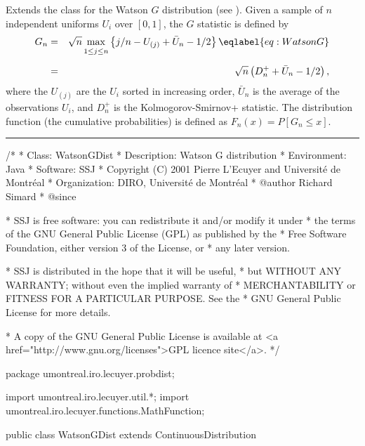 
Extends the class  for the
Watson $G$  distribution (see \cite{tDAR83a,tWAT76a}).
Given a sample of $n$ independent uniforms $U_i$ over $[0,1]$,
the $G$ statistic is defined by
 \begin {eqnarray}
  G_n &=& \sqrt{n} \max_{\rule{0pt}{7pt} 1\le j \le n} \left\{ j/n -
         U_{(j)} + \bar U_n - 1/2 \right\}  \eqlabel {eq:WatsonG} \\[6pt]
    &=& \sqrt{n}\left (D_n^+ + \bar U_n  - 1/2\right), \nonumber
 \end {eqnarray}
  where the $U_{(j)}$ are the $U_i$ sorted in increasing order,
  $\bar U_n$ is the average of the observations $U_{i}$,
  and $D_n^+$ is the Kolmogorov-Smirnov+ statistic.
  The  distribution function (the cumulative probabilities)
  is defined as $F_n(x) = P[G_n \le x]$.


\bigskip\hrule

\begin{code}
\begin{hide}
/*
 * Class:        WatsonGDist
 * Description:  Watson G distribution
 * Environment:  Java
 * Software:     SSJ 
 * Copyright (C) 2001  Pierre L'Ecuyer and Université de Montréal
 * Organization: DIRO, Université de Montréal
 * @author       Richard Simard
 * @since

 * SSJ is free software: you can redistribute it and/or modify it under
 * the terms of the GNU General Public License (GPL) as published by the
 * Free Software Foundation, either version 3 of the License, or
 * any later version.

 * SSJ is distributed in the hope that it will be useful,
 * but WITHOUT ANY WARRANTY; without even the implied warranty of
 * MERCHANTABILITY or FITNESS FOR A PARTICULAR PURPOSE.  See the
 * GNU General Public License for more details.

 * A copy of the GNU General Public License is available at
   <a href="http://www.gnu.org/licenses">GPL licence site</a>.
 */
\end{hide}
package umontreal.iro.lecuyer.probdist;
\begin{hide}
import umontreal.iro.lecuyer.util.*;
import umontreal.iro.lecuyer.functions.MathFunction;
\end{hide} 

public class WatsonGDist extends ContinuousDistribution\begin{hide} {
   protected int n;

   private static class Function implements MathFunction {
      protected int n;
      protected double u;

      public Function (int n, double u) {
         this.n = n;
         this.u = u;
      }

      public double evaluate (double x) {
         return u - cdf(n,x);
      }
   }
\end{hide}
\end{code}
